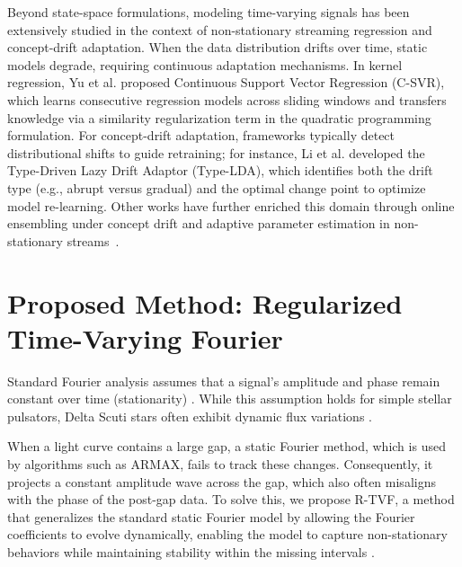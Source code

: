 \documentclass[a4paper,fleqn]{cas-sc}
\begin{document}
{\color{blue}Beyond state-space formulations, modeling time-varying signals has been extensively studied in the context of non-stationary streaming regression and concept-drift adaptation. When the data distribution drifts over time, static models degrade, requiring continuous adaptation mechanisms. In kernel regression, Yu et al. \cite{yu2022continuous} proposed Continuous Support Vector Regression (C-SVR), which learns consecutive regression models across sliding windows and transfers knowledge via a similarity regularization term in the quadratic programming formulation. For concept-drift adaptation, frameworks typically detect distributional shifts to guide retraining; for instance, Li et al. \cite{li2024concept} developed the Type-Driven Lazy Drift Adaptor (Type-LDA), which identifies both the drift type (e.g., abrupt versus gradual) and the optimal change point to optimize model re-learning. Other works have further enriched this domain through online ensembling under concept drift \cite{wen2023onenet} and adaptive parameter estimation in non-stationary streams~\cite{hoeltgebaum2021estimation}.}

\section{Proposed Method: Regularized Time-Varying Fourier} \label{sec:rtvf}


Standard Fourier analysis assumes that a signal's amplitude and phase remain constant over time (stationarity) \cite{deeming1975fourier}. While this assumption holds for simple stellar pulsators, Delta Scuti stars often exhibit dynamic flux variations \cite{ortega2025asteroseismology}.

When a light curve contains a large gap, a static Fourier method, which is used by algorithms such as ARMAX, fails to track these changes. Consequently, it projects a constant amplitude wave across the gap, which also often misaligns with the phase of the post-gap data. To solve this, we propose R-TVF, a method that generalizes the standard static Fourier model by allowing the Fourier coefficients to evolve dynamically, enabling the model to capture non-stationary behaviors \cite{young1999dynamic, prado2010time} while maintaining stability within the missing intervals \cite{durbin2012time}.
\end{document}
